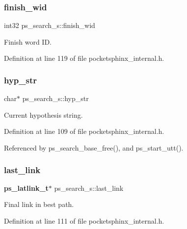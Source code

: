 \mbox{\label{structps__search__s_a0fb4d79f1084bdbbc0a808513f7c1ca7}} 
\subsubsection{finish\+\_\+wid}
{\footnotesize\ttfamily int32 ps\+\_\+search\+\_\+s\+::finish\+\_\+wid}



Finish word ID. 



Definition at line 119 of file pocketsphinx\+\_\+internal.\+h.

\mbox{\label{structps__search__s_aa398c736a887af97e42b2a562359adc3}} 
\subsubsection{hyp\+\_\+str}
{\footnotesize\ttfamily char$\ast$ ps\+\_\+search\+\_\+s\+::hyp\+\_\+str}



Current hypothesis string. 



Definition at line 109 of file pocketsphinx\+\_\+internal.\+h.



Referenced by ps\+\_\+search\+\_\+base\+\_\+free(), and ps\+\_\+start\+\_\+utt().

\mbox{\label{structps__search__s_aa3020ef7bd4e56713dfe2fbad52e6e4f}} 
\subsubsection{last\+\_\+link}
{\footnotesize\ttfamily \textbf{ ps\+\_\+latlink\+\_\+t}$\ast$ ps\+\_\+search\+\_\+s\+::last\+\_\+link}



Final link in best path. 



Definition at line 111 of file pocketsphinx\+\_\+internal.\+h.



